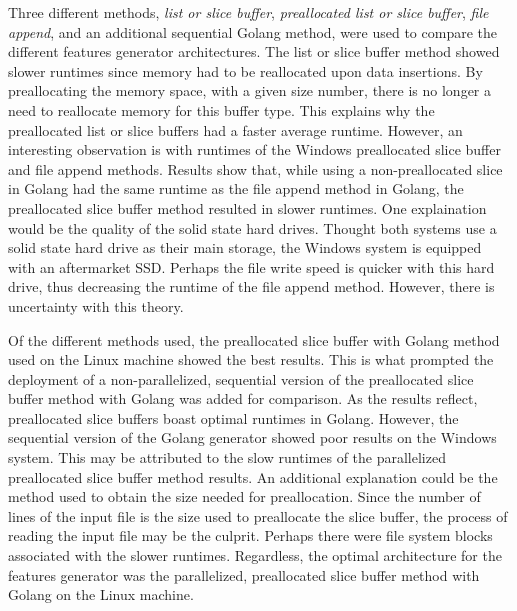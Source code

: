 Three different methods, \textit{list or slice buffer}, \textit{preallocated list or slice buffer}, \textit{file append}, and an additional sequential Golang method, were used to compare the different features generator architectures. The list or slice buffer method showed slower runtimes since memory had to be reallocated upon data insertions. By preallocating the memory space, with a given size number, there is no longer a need to reallocate memory for this buffer type. This explains why the preallocated list or slice buffers had a faster average runtime. However, an interesting observation is with runtimes of the Windows preallocated slice buffer and file append methods. Results show that, while using a non-preallocated slice in Golang had the same runtime as the file append method in Golang, the preallocated slice buffer method resulted in slower runtimes. One explaination would be the quality of the solid state hard drives. Thought both systems use a solid state hard drive as their main storage, the Windows system is equipped with an aftermarket SSD. Perhaps the file write speed is quicker with this hard drive, thus decreasing the runtime of the file append method. However, there is uncertainty with this theory.

Of the different methods used, the preallocated slice buffer with Golang method used on the Linux machine showed the best results. This is what prompted the deployment of a non-parallelized, sequential version of the preallocated slice buffer method with Golang was added for comparison. As the results reflect, preallocated slice buffers boast optimal runtimes in Golang. However, the sequential version of the Golang generator showed poor results on the Windows system. This may be attributed to the slow runtimes of the parallelized preallocated slice buffer method results. An additional explanation could be the method used to obtain the size needed for preallocation. Since the number of lines of the input file is the size used to preallocate the slice buffer, the process of reading the input file may be the culprit. Perhaps there were file system blocks associated with the slower runtimes. Regardless, the optimal architecture for the features generator was the parallelized, preallocated slice buffer method with Golang on the Linux machine.
